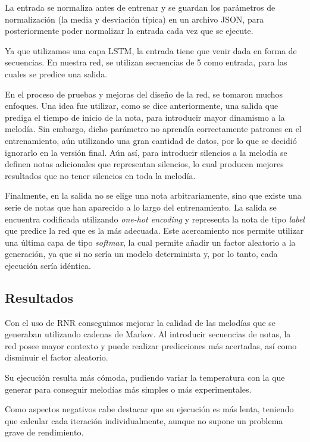     La entrada se normaliza antes de entrenar y se guardan los parámetros de normalización (la media y desviación típica) en un archivo JSON, para posteriormente poder normalizar la entrada cada vez que se ejecute. 

    Ya que utilizamos una capa LSTM, la entrada tiene que venir dada en forma de secuencias. En nuestra red, se utilizan secuencias de 5 como entrada, para las cuales se predice una salida.

    En el proceso de pruebas y mejoras del diseño de la red, se tomaron muchos enfoques. Una idea fue utilizar, como se dice anteriormente, una salida que prediga el tiempo de inicio de la nota, para introducir mayor dinamismo a la melodía. Sin embargo, dicho parámetro no aprendía correctamente patrones en el entrenamiento, aún utilizando una gran cantidad de datos, por lo que se decidió ignorarlo en la versión final. Aún así, para introducir silencios a la melodía se definen notas adicionales que representan silencios, lo cual producen mejores resultados que no tener silencios en toda la melodía.

    Finalmente, en la salida no se elige una nota arbitrariamente, sino que existe una serie de notas que han aparecido a lo largo del entrenamiento. La salida se encuentra codificada utilizando \textit{one-hot encoding} y representa la nota de tipo \textit{label} que predice la red que es la más adecuada. Este acercamiento nos permite utilizar una última capa de tipo \textit{softmax}, la cual permite añadir un factor aleatorio a la generación, ya que si no sería un modelo determinista y, por lo tanto, cada ejecución sería idéntica.
    
    \subsection{Resultados}
    \label{subsec:resultadosRNR}
    Con el uso de RNR conseguimos mejorar la calidad de las melodías que se generaban utilizando cadenas de Markov. Al introducir secuencias de notas, la red posee mayor contexto y puede realizar predicciones más acertadas, así como disminuir el factor aleatorio.

    Su ejecución resulta más cómoda, pudiendo variar la temperatura con la que generar para conseguir melodías más simples o más experimentales.

    Como aspectos negativos cabe destacar que su ejecución es más lenta, teniendo que calcular cada iteración individualmente, aunque no supone un problema grave de rendimiento.

